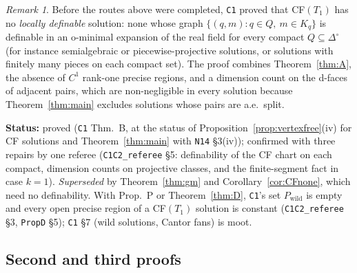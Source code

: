 \documentclass[11pt]{article}
\theoremstyle{definition}
\theoremstyle{remark}
\newtheorem{remark}[theorem]{Remark}
\newcommand{\Di}{\Delta^{\circ}}
\newcommand{\src}[1]{\texttt{#1}}
\newcommand{\status}[1]{\par\smallskip\noindent\textbf{Status:} #1\par\smallskip}
\begin{document}
\begin{remark}\label{rem:B}
Before the routes above were completed, \src{C1} proved that CF$(T_1)$ has no \emph{locally definable} solution: none whose graph $\{(q,m):q\in Q,\ m\in K_q\}$ is definable in an o-minimal expansion of the real field for every compact $Q\subseteq\Di$ (for instance semialgebraic or piecewise-projective solutions, or solutions with finitely many pieces on each compact set). The proof combines Theorem~\ref{thm:A}, the absence of $C^1$ rank-one precise regions, and a dimension count on the d-faces of adjacent pairs, which are non-negligible in every solution because Theorem~\ref{thm:main} excludes solutions whose pairs are a.e.\ split.
\end{remark}
\status{proved (\src{C1} Thm.~B, at the status of Proposition~\ref{prop:vertexfree}(iv) for CF solutions and Theorem~\ref{thm:main} with \src{N14} \S3(iv)); confirmed with three repairs by one referee (\src{C1C2\_referee} \S5: definability of the CF chart on each compact, dimension counts on projective classes, and the finite-segment fact in case $k=1$). \emph{Superseded} by Theorem~\ref{thm:gm} and Corollary~\ref{cor:CFnone}, which need no definability. With Prop.~P or Theorem~\ref{thm:D}, \src{C1}'s set $P_{\mathrm{wild}}$ is empty and every open precise region of a CF$(T_1)$ solution is constant (\src{C1C2\_referee} \S3, \src{PropD} \S5); \src{C1} \S7 (wild solutions, Cantor fans) is moot.}

\subsection{Second and third proofs}\label{sec:gm-other}
\end{document}
